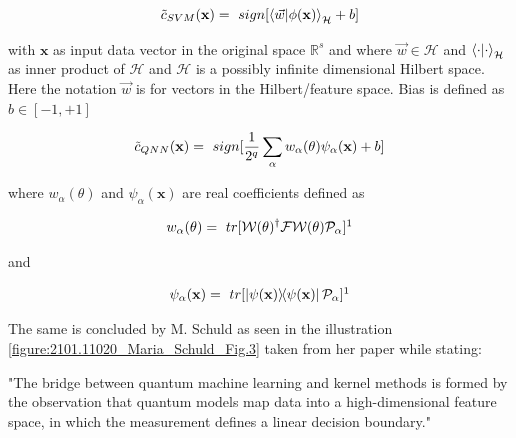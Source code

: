 \begin{equation}
    \centering
        \tilde{c}_{SVM}(\mathbf{x}) =\ sign[\ip{\Vec{w}}{\phi(\mathbf{x})}_{\mathcal{H}}+b]
    \label{equation:svm_decision_function}
\end{equation}

with $\mathbf{x}$ as input data vector in the original space $\mathbb{R}^s$ and where $\Vec{w} \in \mathcal{H}$ and $\ip{\cdot}{\cdot}_{\mathcal{H}}$ as inner product of $\mathcal{H}$ and $\mathcal{H}$ is a possibly infinite dimensional Hilbert space. Here the notation $\Vec{w}$ is for vectors in the Hilbert/feature space. Bias is defined as $b \in [−1, +1]$

\begin{equation}
    \centering
        \tilde{c}_{QNN}(\mathbf{x}) =\ sign[\frac{1}{2^q} \sum_{\alpha} w_{\alpha}(\theta)\psi_{\alpha}(\mathbf{x})+b]
    \label{equation:qnn_decision_function}
\end{equation}

where $w_{\alpha}(\theta)$ and $\psi_{\alpha}(\mathbf{x})$ are real coefficients defined as

\begin{equation}
    \centering
        w_{\alpha}(\theta) =\ tr[\mathcal{W}(\theta)^{\dag}\mathcal{F}\mathcal{W}(\theta)\mathcal{P}_{\alpha}]\footnotemark[1]
    \label{equation:w_alpha_real_coefficient}
\end{equation}

and 

\begin{equation}
    \centering
        \psi_{\alpha}(\mathbf{x}) =\ tr[\op{\psi(\mathbf{x})}{\psi(\mathbf{x})}\mathcal{P}_{\alpha}]\footnotemark[1]
    \label{equation:psi_alpha_real_coefficient}
\end{equation}


The same is concluded by M. Schuld as seen in the illustration \ref{figure:2101.11020_Maria_Schuld_Fig.3} taken from her paper \cite{schuld_SQMLmodelsAreKernelMethods} while stating: 
\begin{displayquote}
"The bridge between quantum machine learning and kernel methods is formed by the observation that quantum models map data into a high-dimensional feature space, in which the measurement defines a linear decision boundary."
\end{displayquote}

